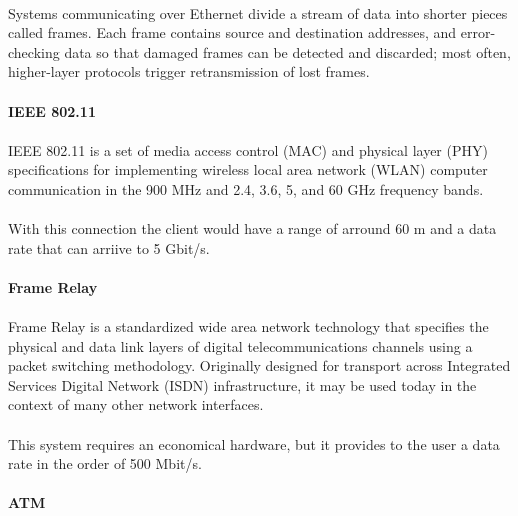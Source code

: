 \paragraph{}
Systems communicating over Ethernet divide a stream of data into shorter pieces called frames. Each frame contains source and destination addresses, and error-checking data so that damaged frames can be detected and discarded; most often, higher-layer protocols trigger retransmission of lost frames.

\paragraph{} \textbf{IEEE 802.11}
\paragraph{}
IEEE 802.11 is a set of media access control (MAC) and physical layer (PHY) specifications for implementing wireless local area network (WLAN) computer communication in the 900 MHz and 2.4, 3.6, 5, and 60 GHz frequency bands. 
\paragraph{}
With this connection the client would have a range of arround 60 m and  a data rate that can arriive to 5 Gbit/s.

\paragraph{} \textbf{Frame Relay}
\paragraph{}
Frame Relay is a standardized wide area network technology that specifies the physical and data link layers of digital telecommunications channels using a packet switching methodology. Originally designed for transport across Integrated Services Digital Network (ISDN) infrastructure, it may be used today in the context of many other network interfaces.
\paragraph{}
This system requires an economical hardware, but it provides to the user a data rate in the order of 500 Mbit/s.

\paragraph{} \textbf{ATM}
